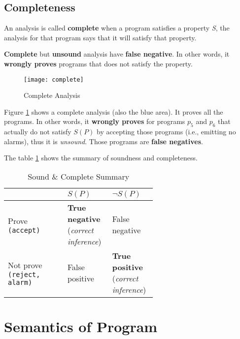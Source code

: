 \subsection{Completeness}

An analysis is called \textbf{complete} when a program satisfies a
property \textsl{S}, the analysis for that program says that it will
satisfy that property.


\textbf{Complete} but \textbf{unsound} analysis have \textbf{false
  negative}. In other words, it \textbf{wrongly proves} programs that
does not satisfy the property.


\begin{figure}[h]
  \texttt{[image: complete]}
  \caption{Complete Analysis}
  \label{fig:complete}
\end{figure}

Figure \ref{fig:complete} shows a complete analysis (also the blue
area). It proves all the programs. In other words, it \textbf{wrongly
  proves} for programs $ p_5 $ and $ p_6 $ that actually do not
satisfy $ S(P) $ by accepting those programs (i.e., emitting no
alarms), thus it is \textit{unsound}. Those programs are \textbf{false
  negatives}.


The table \ref{tab:summary} shows the summary of soundness and
completeness.

\begin{table}[ht]
  \centering
  \caption{Sound \& Complete Summary}
  \label{tab:summary}

  \begin{tabular}[t]{l>{\raggedright}p{0.3\linewidth}>{\raggedright\arraybackslash}p{0.3\linewidth}}
    \hline
    & $ S(P) $ & $ \neg S(P) $ \\
    \hline
    Prove \texttt{(accept)} & \textbf{True negative} (\textsl{correct inference}) & False negative \\
    Not prove \texttt{(reject, alarm)} & False positive & \textbf{True positive} (\textsl{correct inference}) \\
    \hline
  \end{tabular}
\end{table}%



\section{Semantics of Program}
\label{sec:semantics}

